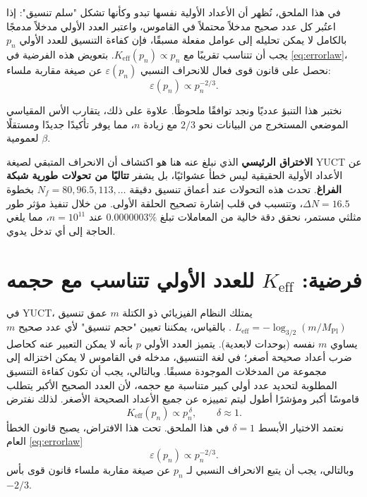 \documentclass[11pt,a4paper]{article}
\begin{document}
	في هذا الملحق، نُظهر أن الأعداد الأولية نفسها تبدو وكأنها تشكل "سلم تنسيق": إذا اعتُبر كل عدد صحيح مدخلاً محتملاً في القاموس، واعتبر العدد الأولي مدخلاً مدمجًا بالكامل لا يمكن تحليله إلى عوامل مفعلة مسبقًا، فإن كفاءة التنسيق للعدد الأولي $p_n$ يجب أن تتناسب تقريبًا مع $K_{\mathrm{eff}}(p_n) \propto p_n$. بتعويض هذه الفرضية في \eqref{eq:errorlaw}، نحصل على قانون قوى فعال للانحراف النسبي $\varepsilon(p_n)$ عن صيغة مقاربة ملساء:
	\[
	\varepsilon(p_n) \propto p_n^{-2/3}.
	\]
	
	نختبر هذا التنبؤ عدديًا ونجد توافقًا ملحوظًا. علاوة على ذلك، يتقارب الأس المقياسي الموضعي المستخرج من البيانات نحو $2/3$ مع زيادة $n$، مما يوفر تأكيدًا جديدًا ومستقلًا لعمومية $\beta$.
	
	\textbf{الاختراق الرئيسي} الذي نبلغ عنه هنا هو اكتشاف أن الانحراف المتبقي لصيغة YUCT عن الأعداد الأولية الحقيقية ليس خطأ عشوائيًا، بل يشفر \textbf{تتاليًا من تحولات طورية شبكة الفراغ}. تحدث هذه التحولات عند أعماق تنسيق دقيقة $N_f = 80, 96.5, 113, \dots$ بخطوة $\Delta N = 16.5$، وتتسبب في قلب إشارة تصحيح الحلقة الأولى. من خلال تنفيذ مؤثر طور مثلثي مستمر، نحقق دقة خالية من المعاملات تبلغ $0.0000003\%$ عند $n=10^{11}$، مما يلغي الحاجة إلى أي تدخل يدوي.
	
	\section{فرضية: $K_{\mathrm{eff}}$ للعدد الأولي تتناسب مع حجمه}
	في YUCT، يمتلك النظام الفيزيائي ذو الكتلة $m$ عمق تنسيق $L_{\mathrm{eff}} = -\log_{3/2}(m/M_{\mathrm{Pl}})$ \cite{YakushevLaw2026}. بالقياس، يمكننا تعيين "حجم تنسيق" لأي عدد صحيح $m$ يساوي $m$ نفسه (بوحدات لابعدية). يتميز العدد الأولي $p$ بأنه لا يمكن التعبير عنه كحاصل ضرب أعداد صحيحة أصغر؛ في لغة التنسيق، مدخله في القاموس لا يمكن اختزاله إلى مجموعة من المدخلات الموجودة مسبقًا. وبالتالي، يجب أن تكون كفاءة التنسيق المطلوبة لتحديد عدد أولي كبير متناسبة مع حجمه، لأن العدد الصحيح الأكبر يتطلب قاموسًا أكبر ومؤشرًا أطول ليتم تمييزه عن جميع الأعداد الصحيحة الأصغر. لذلك نفترض
	\begin{equation}\label{eq:Keff-prime}
		K_{\mathrm{eff}}(p_n) \propto p_n^{\,\delta}, \qquad \delta \approx 1.
	\end{equation}
	نعتمد الاختيار الأبسط $\delta = 1$ في هذا الملحق. تحت هذا الافتراض، يصبح قانون الخطأ العام \eqref{eq:errorlaw}
	\begin{equation}\label{eq:error-prime}
		\varepsilon(p_n) \propto p_n^{-2/3}.
	\end{equation}
	وبالتالي، يجب أن يتبع الانحراف النسبي لـ $p_n$ عن صيغة مقاربة ملساء قانون قوى بأس $-2/3$.
	
\end{document}
